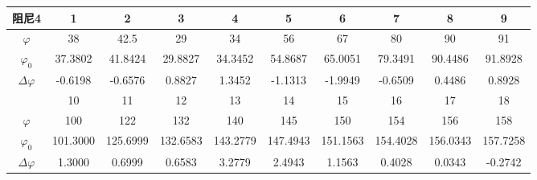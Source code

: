 \documentclass[UTF8]{ctexart}
\begin{document}
        \begin{table}[!htbp]
            \centering
            \begin{tabular}{|c|c|c|c|c|c|c|c|c|c|}
            \hline
            阻尼4             & 1        & 2        & 3        & 4        & 5        & 6        & 7        & 8         & 9        \\ \hline
            $\varphi$       & 38       & 42.5     & 29       & 34       & 56       & 67       & 80       & 90        & 91       \\ \hline
            $\varphi_{0}$   & 37.3802  & 41.8424  & 29.8827  & 34.3452  & 54.8687  & 65.0051  & 79.3491  & 90.4486   & 91.8928  \\ \hline
            $\Delta\varphi$ & -0.6198  & -0.6576  & 0.8827   & 1.3452   & -1.1313  & -1.9949  & -0.6509  & 0.4486    & 0.8928   \\ \hline
                            & 10       & 11       & 12       & 13       & 14       & 15       & 16       & 17        & 18       \\ \hline
            $\varphi$       & 100      & 122      & 132      & 140      & 145      & 150      & 154      & 156       & 158      \\ \hline
            $\varphi_{0}$   & 101.3000 & 125.6999 & 132.6583 & 143.2779 & 147.4943 & 151.1563 & 154.4028 & 156.0343  & 157.7258 \\ \hline
            $\Delta\varphi$ & 1.3000   & 0.6999   & 0.6583   & 3.2779   & 2.4943   & 1.1563   & 0.4028   & 0.0343    & -0.2742  \\ \hline
            \end{tabular}
        \end{table}
\end{document}
